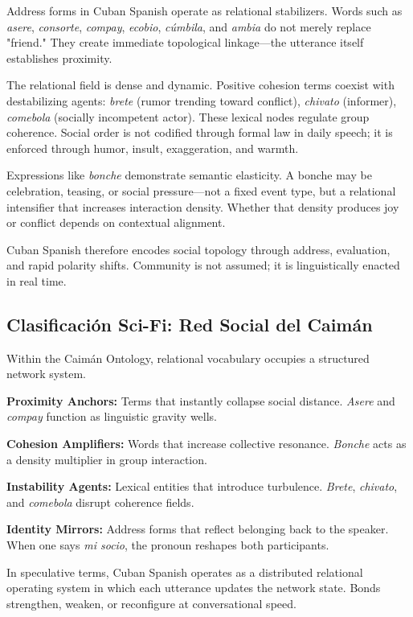 \documentclass[12pt]{article}
\begin{document}
Address forms in Cuban Spanish operate as relational stabilizers. Words such as \textit{asere}, \textit{consorte}, \textit{compay}, \textit{ecobio}, \textit{cúmbila}, and \textit{ambia} do not merely replace "friend." They create immediate topological linkage---the utterance itself establishes proximity.

The relational field is dense and dynamic. Positive cohesion terms coexist with destabilizing agents: \textit{brete} (rumor trending toward conflict), \textit{chivato} (informer), \textit{comebola} (socially incompetent actor). These lexical nodes regulate group coherence. Social order is not codified through formal law in daily speech; it is enforced through humor, insult, exaggeration, and warmth.

Expressions like \textit{bonche} demonstrate semantic elasticity. A bonche may be celebration, teasing, or social pressure---not a fixed event type, but a relational intensifier that increases interaction density. Whether that density produces joy or conflict depends on contextual alignment.

Cuban Spanish therefore encodes social topology through address, evaluation, and rapid polarity shifts. Community is not assumed; it is linguistically enacted in real time.

\subsection*{Clasificación Sci-Fi: Red Social del Caimán}

Within the Caimán Ontology, relational vocabulary occupies a structured network system.

\textbf{Proximity Anchors:} Terms that instantly collapse social distance. \textit{Asere} and \textit{compay} function as linguistic gravity wells.

\textbf{Cohesion Amplifiers:} Words that increase collective resonance. \textit{Bonche} acts as a density multiplier in group interaction.

\textbf{Instability Agents:} Lexical entities that introduce turbulence. \textit{Brete}, \textit{chivato}, and \textit{comebola} disrupt coherence fields.

\textbf{Identity Mirrors:} Address forms that reflect belonging back to the speaker. When one says \textit{mi socio}, the pronoun reshapes both participants.

In speculative terms, Cuban Spanish operates as a distributed relational operating system in which each utterance updates the network state. Bonds strengthen, weaken, or reconfigure at conversational speed.
\end{document}
